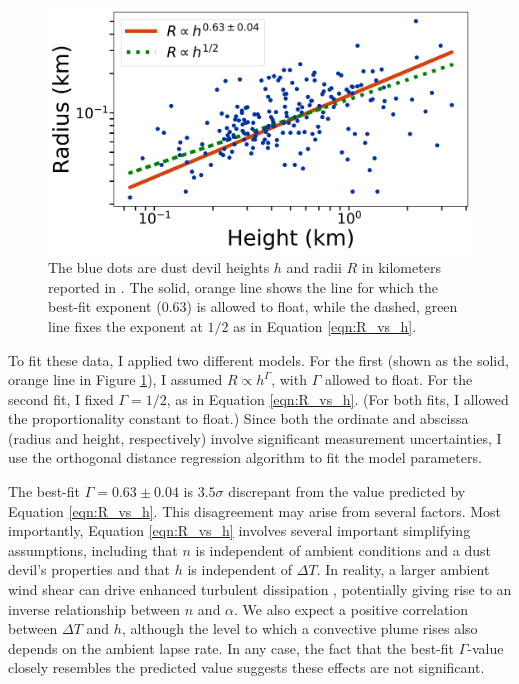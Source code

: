 \documentclass{aastex63}
\begin{document}
\begin{figure}
    \centering
    \includegraphics[width=\textwidth]{Fit_to_Stanzel_data.png}
    \caption{The blue dots are dust devil heights $h$ and radii $R$ in kilometers reported in \citet{2008Icar..197...39S}. The solid, orange line shows the line for which the best-fit exponent (0.63) is allowed to float, while the dashed, green line fixes the exponent at $1/2$ as in Equation \ref{eqn:R_vs_h}.}
    \label{fig:Fit_to_Stanzel_data}
\end{figure}

To fit these data, I applied two different models. For the first (shown as the solid, orange line in Figure \ref{fig:Fit_to_Stanzel_data}), I assumed $R \propto h^\Gamma$, with $\Gamma$ allowed to float. For the second fit, I fixed $\Gamma = 1/2$, as in Equation \ref{eqn:R_vs_h}. (For both fits, I allowed the proportionality constant to float.) Since both the ordinate and abscissa (radius and height, respectively) involve significant measurement uncertainties, I use the orthogonal distance regression algorithm \citep{odrref, scipy} to fit the model parameters.

The best-fit $\Gamma = 0.63 \pm 0.04$ is $3.5\sigma$ discrepant from the value predicted by Equation \ref{eqn:R_vs_h}. This disagreement may arise from several factors. Most importantly, Equation \ref{eqn:R_vs_h} involves several important simplifying assumptions, including that $n$ is independent of ambient conditions and a dust devil's properties and that $h$ is independent of $\Delta T$. In reality, a larger ambient wind shear can drive enhanced turbulent dissipation \citep{arya1988}, potentially giving rise to an inverse relationship between $n$ and $\alpha$. We also expect a positive correlation between $\Delta T$ and $h$, although the level to which a convective plume rises also depends on the ambient lapse rate. In any case, the fact that the best-fit $\Gamma$-value closely resembles the predicted value suggests these effects are not significant.
\end{document}
